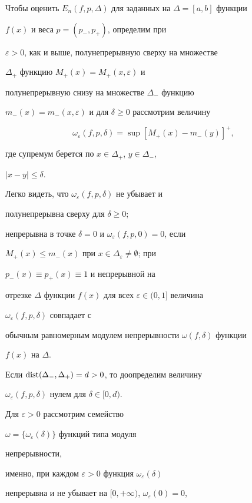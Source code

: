 Чтобы оценить $E_n(f,p,\Delta)$ для заданных на $\Delta=[a,b]$ функции


$f(x)$ и веса $p=(p_-,p_+)$, определим при


$\varepsilon>0$, как и выше, полунепрерывную сверху на множестве


$\Delta_+$ функцию $M_+(x)=M_+(x,\varepsilon)$ и


полунепрерывную снизу на множестве $\Delta_-$ функцию


$m_-(x)=m_-(x,\varepsilon)$ и для $\delta\ge 0$ рассмотрим величину


$$


\omega_\varepsilon(f,p,\delta)=\sup[M_+(x)-m_-(y)]^+,


$$


где супремум берется по $x\in\Delta_+$, $y\in\Delta_-$,


$|x-y|\le\delta$.


Легко видеть, что $\omega_\varepsilon(f,p,\delta)$ не убывает и


полунепрерывна сверху для $\delta\ge 0$;


непрерывна в точке $\delta=0$ и $\omega_\varepsilon(f,p,0)=0$, если


$M_+(x)\le m_-(x)$ при $x\in\Delta_\varepsilon\ne\emptyset$; при


$p_-(x)\equiv p_+(x)\equiv 1$ и непрерывной на


отрезке $\Delta$ функции $f(x)$ для всех $\varepsilon\in(0,1]$ величина


$\omega_\varepsilon(f,p,\delta)$ совпадает с


обычным равномерным модулем непрерывности $\omega(f,\delta)$ функции


$f(x)$ на $\Delta$.





Если $\operatorname{dist}(\Delta_-,\Delta_+)=d>0$, то доопределим величину


$\omega_\varepsilon(f,p,\delta)$ нулем для $\delta\in[0,d)$.





Для $\varepsilon>0$ рассмотрим семейство


$\omega=\{\omega_\varepsilon(\delta)\}$ функций типа модуля


непрерывности,


именно, при каждом $\varepsilon>0$ функция $\omega_\varepsilon(\delta)$


непрерывна и не убывает на $[0,+\infty)$, $\omega_\varepsilon(0)=0$,


